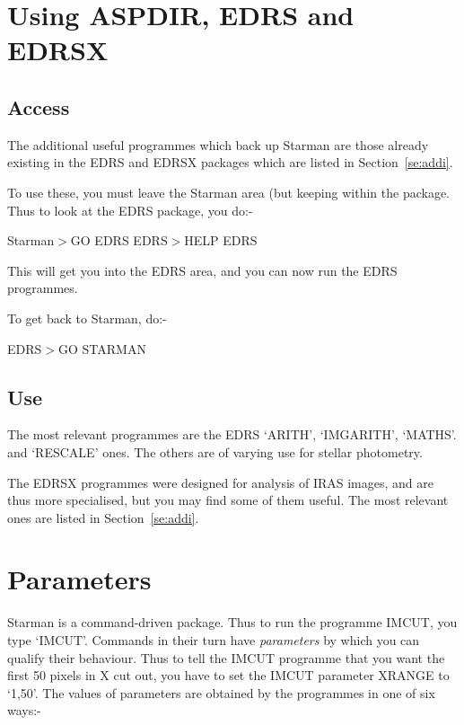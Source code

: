 \section{Using ASPDIR, EDRS and EDRSX }
\label{se:packs}

\subsection{Access}

The additional useful programmes which back up Starman are those already
existing in the EDRS and EDRSX packages which are listed in Section~\ref{se:addi}.

To use these, you must leave the Starman area (but keeping within the 
package. Thus to look at the EDRS package, you do:-

Starman$>$GO EDRS \newline
EDRS$>$HELP EDRS

This will get you into the EDRS area, and you can now run the EDRS 
programmes.

To get back to Starman, do:-

EDRS$>$GO STARMAN

\subsection{Use}

The most relevant programmes are the EDRS 
`ARITH', `IMGARITH', `MATHS'. and `RESCALE' ones.
The others are of varying use for stellar photometry.

The EDRSX programmes were designed for analysis of IRAS images, and are
thus more specialised, but you may find some of them useful. The most
relevant ones are listed in Section~\ref{se:addi}.

\section{Parameters}
\label{se:param}

Starman is a command-driven package.  Thus to run the programme IMCUT, you 
type `IMCUT'. Commands in their turn have
{\em parameters\/} by which you can qualify their behaviour. Thus to tell 
the IMCUT programme that you want the first 50 pixels in X cut out, you
have to set the IMCUT parameter XRANGE to `1,50'. The values of
parameters are obtained by the programmes in one of six ways:-

